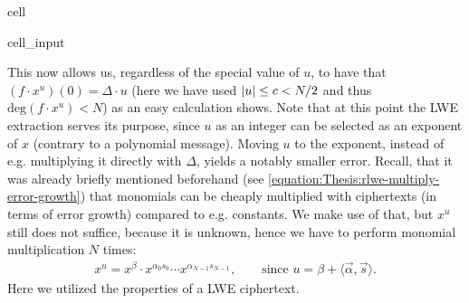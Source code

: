 \documentclass[letterpaper,10pt,english]{jupyterBook}
\begin{document}
\begin{sphinxuseclass}{cell}\begin{sphinxVerbatimInput}

\begin{sphinxuseclass}{cell_input}
\begin{sphinxVerbatim}[commandchars=\\\{\}]
    
      \PYG{p}{[}    \PYG{p}{]}
         
        \PYG{p}{[}\PYG{p}{]}  
          
        \PYG{p}{[}  \PYG{p}{]}  
      
\end{sphinxVerbatim}

\end{sphinxuseclass}\end{sphinxVerbatimInput}

\end{sphinxuseclass}
\sphinxAtStartPar
This now allows us, regardless of the special value of \(u\), to have that \((f\cdot x^u)(0) = \Delta \cdot u\) (here we have used \(\left\lvert u \right\rvert \le c < N/2\) and thus \(\mathrm{deg}(f\cdot x^u) < N\)) as an easy calculation shows.
Note that at this point the LWE extraction serves its purpose, since \(u\) as an integer can be selected as an exponent of \(x\) (contrary to a polynomial message).
Moving \(u\) to the exponent, instead of e.g. multiplying it directly with \(\Delta\), yields a notably smaller error.
Recall, that it was already briefly mentioned beforehand (see \eqref{equation:Thesis:rlwe-multiply-error-growth}) that monomials can be cheaply multiplied with ciphertexts (in terms of error growth) compared to e.g. constants.
We make use of that, but \(x^u\) still does not suffice, because it is unknown, hence we have to perform monomial multiplication \(N\) times:
\begin{equation*}
\begin{split}x^u = x^\beta \cdot x^{\alpha_0 s_0} \cdots x^{\alpha_{N-1} s_{N-1}}, \qquad \text{since } u = \beta + \langle \vec \alpha, \vec s \rangle.\end{split}
\end{equation*}
\sphinxAtStartPar
Here we utilized the properties of a LWE ciphertext.
\end{document}
